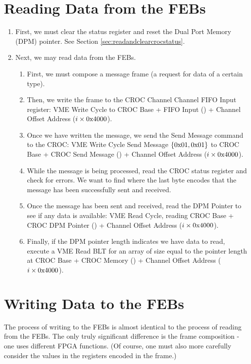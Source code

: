 \section{Reading Data from the FEBs}
\label{sec:readfromfebs}

\begin{enumerate}
\item First, we must clear the status register and reset the Dual Port Memory (DPM) pointer. See Section \ref{sec:readandclearcrocstatus}.
\item Next, we may read data from the FEBs.
\begin{enumerate}
\item First, we must compose a message frame (a request for data of a certain type).
\item Then, we write the frame to the CROC Channel Channel FIFO Input register: VME Write Cycle to CROC Base + FIFO Input () + Channel Offset Address ($i \times \text{0x4000}$).
\item Once we have written the message, we send the Send Message command to the CROC: VME Write Cycle Send Message $\left\{\text{0x01},\text{0x01}\right\}$ to CROC Base + CROC Send Message () + Channel Offset Address ($i \times \text{0x4000}$).
\item While the message is being processed, read the CROC status register and check for errors. We want to find  where the last byte encodes that the message has been successfully sent and received.
\item Once the message has been sent and received, read the DPM Pointer to see if any data is available: VME Read Cycle, reading CROC Base + CROC DPM Pointer () + Channel Offset Address ($i \times \text{0x4000}$).
\item Finally, if the DPM pointer length indicates we have data to read, execute a VME Read BLT for an array of size equal to the pointer length at CROC Base + CROC Memory () + Channel Offset Address ($i \times \text{0x4000}$).
\end{enumerate}
\end{enumerate}

\section{Writing Data to the FEBs}
\label{sec:writetofebs}

The process of writing to the FEBs is almost identical to the process of reading from the FEBs. The only truly significant difference is the frame composition - one uses different FPGA functions. (Of course, one must also more carefully consider the values in the registers encoded in the frame.)

